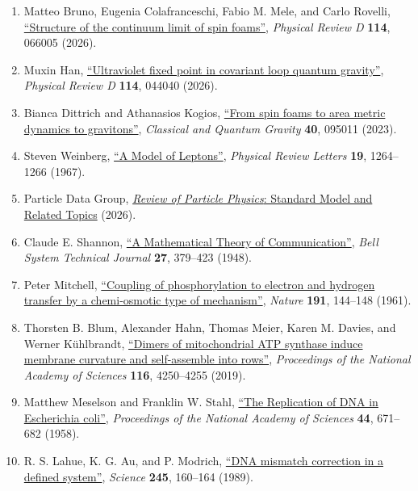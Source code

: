\begin{enumerate}
\def\labelenumi{\arabic{enumi}.}
\setcounter{enumi}{14}
\tightlist
\item
  Matteo Bruno, Eugenia Colafranceschi, Fabio M. Mele, and Carlo Rovelli, \href{https://doi.org/10.1103/7493-9nb7}{``Structure of the continuum limit of spin foams''}, \emph{Physical Review D} \textbf{114}, 066005 (2026).
\item
  Muxin Han, \href{https://doi.org/10.1103/d8s7-jqfl}{``Ultraviolet fixed point in covariant loop quantum gravity''}, \emph{Physical Review D} \textbf{114}, 044040 (2026).
\item
  Bianca Dittrich and Athanasios Kogios, \href{https://doi.org/10.1088/1361-6382/acc5d9}{``From spin foams to area metric dynamics to gravitons''}, \emph{Classical and Quantum Gravity} \textbf{40}, 095011 (2023).
\item
  Steven Weinberg, \href{https://doi.org/10.1103/PhysRevLett.19.1264}{``A Model of Leptons''}, \emph{Physical Review Letters} \textbf{19}, 1264--1266 (1967).
\item
  Particle Data Group, \href{https://pdg.lbl.gov/2026/reviews/standard_model_and_related.html}{\emph{Review of Particle Physics}: Standard Model and Related Topics} (2026).
\item
  Claude E. Shannon, \href{https://doi.org/10.1002/j.1538-7305.1948.tb01338.x}{``A Mathematical Theory of Communication''}, \emph{Bell System Technical Journal} \textbf{27}, 379--423 (1948).
\item
  Peter Mitchell, \href{https://doi.org/10.1038/191144a0}{``Coupling of phosphorylation to electron and hydrogen transfer by a chemi-osmotic type of mechanism''}, \emph{Nature} \textbf{191}, 144--148 (1961).
\item
  Thorsten B. Blum, Alexander Hahn, Thomas Meier, Karen M. Davies, and Werner Kühlbrandt, \href{https://doi.org/10.1073/pnas.1816556116}{``Dimers of mitochondrial ATP synthase induce membrane curvature and self-assemble into rows''}, \emph{Proceedings of the National Academy of Sciences} \textbf{116}, 4250--4255 (2019).
\item
  Matthew Meselson and Franklin W. Stahl, \href{https://doi.org/10.1073/pnas.44.7.671}{``The Replication of DNA in Escherichia coli''}, \emph{Proceedings of the National Academy of Sciences} \textbf{44}, 671--682 (1958).
\item
  R. S. Lahue, K. G. Au, and P. Modrich, \href{https://doi.org/10.1126/science.2665076}{``DNA mismatch correction in a defined system''}, \emph{Science} \textbf{245}, 160--164 (1989).

\end{enumerate}
